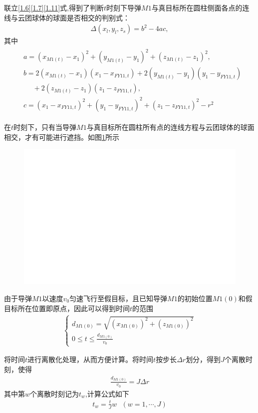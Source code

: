 \documentclass[../main.tex]{subfiles}
\begin{document}
联立\eqref{1.6}\eqref{1.7}\eqref{1.11}式,得到了判断$t$时刻下导弹\( M1 \)与真目标所在圆柱侧面各点的连线与云团球体的球面是否相交的判别式：
\begin{align}
\Delta (x_l,y_l,z_s)=b^2-4ac,\label{1.12}
\end{align}
其中
\begin{align}
\begin{aligned}
&a=(x_{M1(t)}-x_1)^2+(y_{M1(t)}-y_1)^2+(z_{M1(t)}-z_1)^2,
\\
&b=2(x_{M1(t)}-x_1)(x_1-x_{FY11,t})+2(y_{M1(t)}-y_1)(y_1-y_{FY11,t})
\\
&\quad \,\, +2(z_{M1(t)}-z_1)(z_1-z_{FY11,t}),
\\
&c=(x_1-x_{FY11,t})^2+(y_1-y_{FY11,t})^2+(z_1-z_{FY11,t})^2-r^2
\end{aligned}
\end{align}
\par 在$t$时刻下，只有当导弹$M1$与真目标所在圆柱所有点的连线方程与云团球体的球面相交，才有可能进行遮挡。如图\ref{图1}所示
\begin{figure}[H]
\centering
\includegraphics[scale=0.5]{标记图.png}
\caption{}
\label{图1}
\end{figure}
\par 由于导弹$M1$以速度$v_0$匀速飞行至假目标，且已知导弹$M1$的初始位置$M1(0)$和假目标所在位置即原点，因此可以得到时间$t$的范围
\begin{align}\label{1.190}
\begin{cases}
d_{M1(0)} = \sqrt{(x_{M1(0)})^2 + (z_{M1(0)})^2} \\
0 \leq t \leq \frac{d_{M1(0)}}{v_0}
\end{cases}
\end{align}
\par 将时间$t$进行离散化处理，从而方便计算。将时间$t$按步长$\varDelta r$划分，得到$J$个离散时刻，使得
\begin{align}\label{1.191}
	\frac{d_{M1(0)}}{v_0}=J\varDelta r 
\end{align}
其中第$w$个离散时刻记为$t_w$,计算公式如下
\begin{align}\label{1.52}
	t_w=\frac{t}{J}w\,\,\,\,\left( w=1,\cdots,J\right) 
\end{align}
\end{document}
